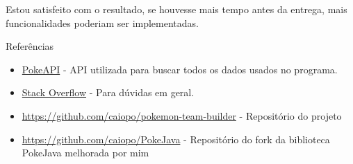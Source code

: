 \documentclass[
	article,			%
	12pt,				%
	oneside,			%
	a4paper,			%
	english,			%
	brazil,				%
	sumario=tradicional
	]{abntex2}
\begin{document}
Estou satisfeito com o resultado, se houvesse mais tempo antes da entrega, mais funcionalidades poderiam ser implementadas.

\vspace{1cm}

\begin{center}
{\HUGE Referências}
\end{center}

\begin{itemize}

\item\href{http://pokeapi.co/}{PokeAPI} - API utilizada para buscar todos os dados usados no programa.

\item\href{http://stackoverflow.com/}{Stack Overflow} - Para dúvidas em geral.

\item\href{https://github.com/caiopo/pokemon-team-builder}{https://github.com/caiopo/pokemon-team-builder} - Repositório do projeto

\item\href{https://github.com/caiopo/PokeJava}{https://github.com/caiopo/PokeJava} - Repositório do fork da biblioteca PokeJava melhorada por mim

\end{itemize}
\end{document}
